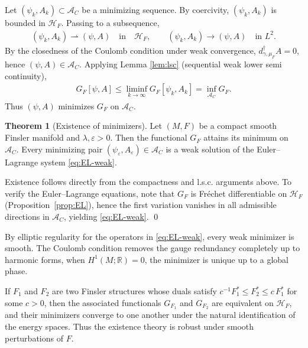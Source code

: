 \documentclass[fleqn,11pt,twoside]{article}
\makeatletter
\renewenvironment{proof}[1][\proofname]{\par
  \normalfont
  \topsep6\p@\@plus6\p@ \trivlist
  \item[\hskip\labelsep\textbf{%
    #1\@addpunct{.}}]\ignorespaces
}{%
  \qed\endtrivlist
}
\theoremstyle{definition}
\newtheorem{theorem}{Theorem}
\newtheorem{remark}{Remark}
\makeatother
\begin{document}
Let $(\psi_k,A_k)\subset\mathcal{A}_C$ be a minimizing sequence.
By coercivity, $(\psi_k,A_k)$ is bounded in $\mathcal{H}_F$.
Passing to a subsequence,
\begin{align*}
(\psi_k,A_k)\rightharpoonup (\psi,A)\quad\text{in}\quad
\mathcal{H}_F, \qquad (\psi_k,A_k)\to (\psi,A) \quad\text{in } L^2.
\end{align*}
By the closedness of the Coulomb condition under weak convergence,
$d^\dagger_{\gamma,\mu_F}A=0$, hence $(\psi,A)\in\mathcal{A}_C$.
Applying Lemma \ref{lem:lsc} (sequential weak lower semi continuity),
\begin{align*}
G_F[\psi,A] \le \liminf_{k\to\infty} G_F[\psi_k,A_k]
= \inf_{\mathcal{A}_C} G_F.
\end{align*}
Thus $(\psi,A)$ minimizes $G_F$ on $\mathcal{A}_C$.

\begin{theorem}[Existence of minimizers]
\label{thm:existence}
Let $(M,F)$ be a compact smooth Finsler manifold and
$\lambda,\varepsilon>0$. Then the functional $G_F$ attains its
minimum on $\mathcal{A}_C$. Every minimizing pair
$(\psi_\varepsilon,A_\varepsilon)\in\mathcal{A}_C$ is a weak solution of
the Euler--Lagrange system \eqref{eq:EL-weak}.
\end{theorem}

\begin{proof}
Existence follows directly from the compactness and l.s.c. arguments above. To verify the Euler--Lagrange equations, note that $G_F$ is Fr\'echet differentiable on $\mathcal{H}_F$ (Proposition~\ref{prop:EL}), hence the first variation vanishes
in all admissible directions in $\mathcal{A}_C$, yielding \eqref{eq:EL-weak}.
\end{proof}

By elliptic regularity for the operators in \eqref{eq:EL-weak}, every weak minimizer is smooth. The Coulomb condition removes the gauge redundancy completely up to harmonic forms, when $H^1(M;\mathbb{R})=0$, the minimizer is unique up to a global phase.

If $F_1$ and $F_2$ are two Finsler structures whose duals
satisfy $c^{-1} F_1^*\le F_2^*\le c\,F_1^*$ for some $c>0$, then the associated functionals $G_{F_1}$ and $G_{F_2}$ are equivalent on $\mathcal{H}_F$, and their minimizers converge to one another under the natural identification of the energy spaces. Thus the existence theory is robust under smooth perturbations of $F$.
\end{document}
